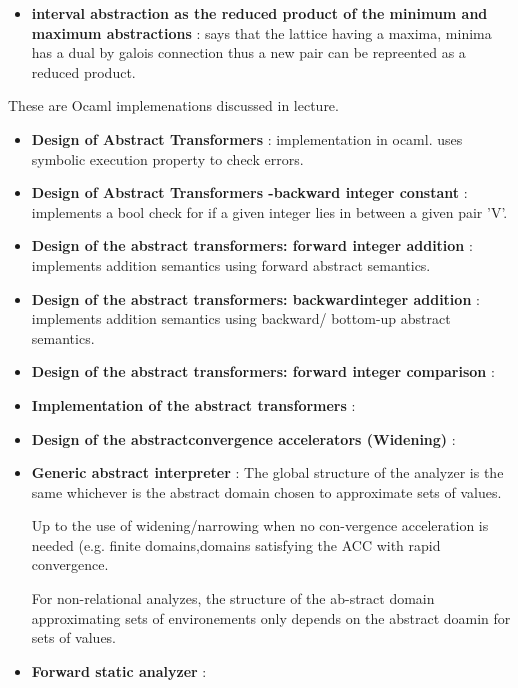 \begin{itemize}
{\begin{itemize}
{		this analysis uses parity analysis too to achieve more reasonable lattice.
		}

		\item{\textbf{interval abstraction as the reduced product of the minimum and maximum abstractions} : says that the lattice having a maxima, minima has a dual by galois connection
		thus a new pair can be repreented as a reduced product.
		}
	\end{itemize}	
	}

\end{itemize}

These are Ocaml implemenations discussed in lecture.

\begin{itemize}

	\item{\textbf{Design of Abstract Transformers} :
	implementation in ocaml. uses symbolic execution property to check errors.
	}

	\item{\textbf{Design of Abstract Transformers -backward integer constant} : implements a bool check for if a given integer lies in between a given pair 'V'.
	}

	\item{\textbf{Design of the abstract transformers: forward integer addition} : implements addition semantics using forward abstract semantics.
	}

	\item{\textbf{Design of the abstract transformers: backwardinteger addition} : implements addition semantics using backward/ bottom-up abstract semantics.
	}

	\item{\textbf{Design of the abstract transformers: forward integer comparison} :
	}

	\item{\textbf{Implementation of the abstract transformers} :
	}

	\item{\textbf{Design of the abstractconvergence accelerators (Widening)} :
	}

	\item{\textbf{Generic abstract interpreter} : 
	The global structure of the analyzer is the same whichever is the abstract domain chosen to approximate sets of values.

	Up to the use of widening/narrowing when no con-vergence acceleration is needed (e.g. finite domains,domains satisfying the ACC with rapid convergence.

	For non-relational analyzes, the structure of the ab-stract domain approximating sets of environements only depends on the abstract doamin for sets of values.
	}

	\item{\textbf{Forward static analyzer} :
	}

	
\end{itemize}